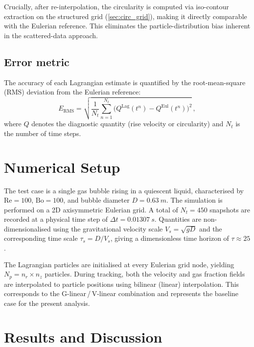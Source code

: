 \documentclass[11pt,a4paper]{article}
\newcommand{\ERMS}{E_{\mathrm{RMS}}}
\begin{document}
Crucially, after re-interpolation, the circularity is computed via
iso-contour extraction on the structured grid (\cref{sec:circ_grid}), making
it directly comparable with the Eulerian reference.  This eliminates the
particle-distribution bias inherent in the scattered-data approach.


\subsection{Error metric}
\label{sec:error_metric}

The accuracy of each Lagrangian estimate is quantified by the root-mean-square
(RMS) deviation from the Eulerian reference:
\begin{equation}\label{eq:rms}
  \ERMS = \sqrt{\frac{1}{N_t}\sum_{n=1}^{N_t}
    \bigl(Q^{\mathrm{Lag}}(t^n) - Q^{\mathrm{Eul}}(t^n)\bigr)^{2}}\,,
\end{equation}
where $Q$ denotes the diagnostic quantity (rise velocity or circularity) and
$N_t$ is the number of time steps.


\section{Numerical Setup}\label{sec:setup}

The test case is a single gas bubble rising in a quiescent liquid,
characterised by $\mathrm{Re} = 100$, $\mathrm{Bo} = 100$, and bubble
diameter $D = \SI{0.63}{m}$.  The simulation is performed on a 2D
axisymmetric Eulerian grid.  A total of $N_t = 450$ snapshots are recorded
at a physical time step of $\Delta t = \SI{0.01307}{s}$.  Quantities are
non-dimensionalised using the gravitational velocity scale $V_s = \sqrt{gD}$
and the corresponding time scale $\tau_s = D / V_s$, giving a dimensionless
time horizon of $\tau \approx 25$.

The Lagrangian particles are initialised at every Eulerian grid node,
yielding $N_p = n_r \times n_z$ particles.  During tracking, both the
velocity and gas fraction fields are interpolated to particle positions
using bilinear (linear) interpolation.  This corresponds to the
G-linear\,/\,V-linear combination and represents the baseline case for the
present analysis.


\section{Results and Discussion}\label{sec:results}
\end{document}
